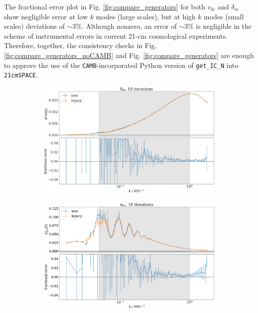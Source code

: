 \documentclass[floats,floatfix,showpacs,amssymb,prd,superscriptaddress,nofootinbib]{revtex4-2} %
\newcommand{\code}{\texttt}
\newcommand{\red}{\textcolor{red}}
\begin{document}
The fractional error plot in Fig. \ref{fig:compare_generators} for both $v_{bc}$ and $\delta_m$ show negligible error at low $k$ modes (large scales), but at high $k$ modes (small scales) deviations of $\sim 3 \%$.
Although nonzero, an error of $\sim 3 \%$ is negligible in the scheme of instrumental errors in current 21-cm cosmological experiments. Therefore, together, the consistency checks in Fig. \ref{fig:compare_generators_noCAMB} and Fig. \ref{fig:compare_generators} are enough to approve the use of the \code{CAMB}-incorporated Python version of \code{get\_IC\_N} into \code{21cmSPACE}.

\newpage
\begin{figure}[H]
     \centering
     \begin{subfigure}[b]{0.9\textwidth}
         \centering
         \includegraphics[width=\textwidth]{images/ic_power_spectra/compare_generators_averaged_power_spectra_with_residual_noCAMB_delta_m.png}
         \label{fig:compare_generators_power_spectrum_noCAMB_delta_m}
     \end{subfigure}
     \hfill
     \begin{subfigure}[b]{0.9\textwidth}
         \centering
         \includegraphics[width=\textwidth]{images/ic_power_spectra/compare_generators_averaged_power_spectra_with_residual_noCAMB_v_bc.png}

\end{subfigure}
\end{figure}
\end{document}
